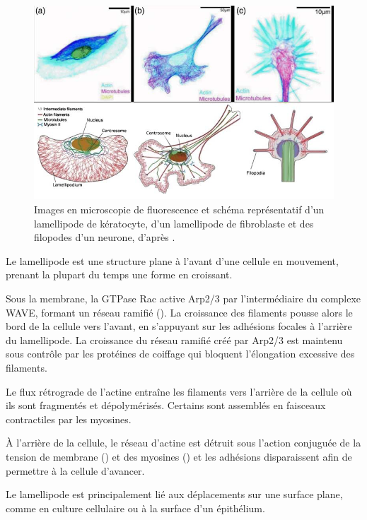 \begin{figure}[h!]
\includegraphics[scale=0.6]{Figures/lamellipode_impress.png}
\caption{Images en microscopie de fluorescence et schéma représentatif d'un lamellipode de kératocyte, d'un lamellipode de fibroblaste et des filopodes d'un neurone, d'après \cite{huber_emergent_2013}. } 
\end{figure}

Le lamellipode est une structure plane à l'avant d'une cellule en mouvement, prenant la plupart du temps une forme en croissant. 

Sous la membrane, la GTPase Rac active Arp2/3 par l'intermédiaire du complexe WAVE, formant un réseau ramifié (\cite{lebensohn_activation_2009}). 
La croissance des filaments pousse alors le bord de la cellule vers l'avant, en s'appuyant sur les adhésions focales à l'arrière du lamellipode. 
La croissance du réseau ramifié créé par Arp2/3 est maintenu sous contrôle par les protéines de coiffage qui bloquent l'élongation excessive des filaments. 

Le flux rétrograde de l'actine entraîne les filaments vers l'arrière de la cellule où ils sont fragmentés et dépolymérisés. 
Certains sont assemblés en faisceaux contractiles par les myosines. 

À l'arrière de la cellule, le réseau d'actine est détruit sous l'action conjuguée de la tension de membrane (\cite{raucher_cell_2000}) et des myosines (\cite{wilson_myosin_2010}) et les adhésions disparaissent afin de permettre à la cellule d'avancer.

Le lamellipode est principalement lié aux déplacements sur une surface plane, comme en culture cellulaire ou à la surface d'un épithélium. 



